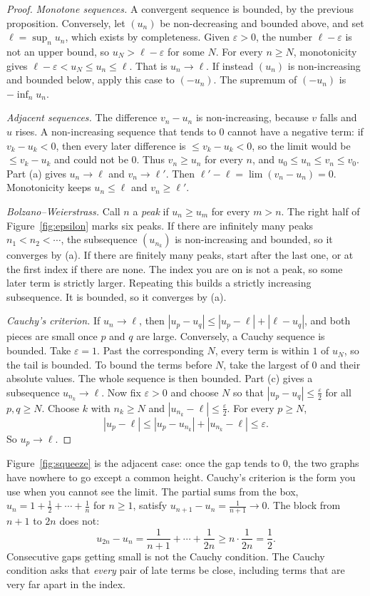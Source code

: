 \begin{proof}
\emph{Monotone sequences.} A convergent sequence is bounded, by the previous proposition. Conversely, let $(u_n)$ be non-decreasing and bounded above, and set $\ell=\sup_n u_n$, which exists by completeness. Given $\varepsilon>0$, the number $\ell-\varepsilon$ is not an upper bound, so $u_N>\ell-\varepsilon$ for some $N$. For every $n\ge N$, monotonicity gives $\ell-\varepsilon<u_N\le u_n\le\ell$. That is $u_n\to\ell$. If instead $(u_n)$ is non-increasing and bounded below, apply this case to $(-u_n)$. The supremum of $(-u_n)$ is $-\inf_n u_n$.

\emph{Adjacent sequences.} The difference $v_n-u_n$ is non-increasing, because $v$ falls and $u$ rises. A non-increasing sequence that tends to $0$ cannot have a negative term: if $v_k-u_k<0$, then every later difference is $\le v_k-u_k<0$, so the limit would be $\le v_k-u_k$ and could not be $0$. Thus $v_n\ge u_n$ for every $n$, and $u_0\le u_n\le v_n\le v_0$. Part (a) gives $u_n\to\ell$ and $v_n\to\ell'$. Then $\ell'-\ell=\lim(v_n-u_n)=0$. Monotonicity keeps $u_n\le\ell$ and $v_n\ge\ell'$.

\emph{Bolzano--Weierstrass.} Call $n$ a \emph{peak} if $u_n\ge u_m$ for every $m>n$. The right half of Figure~\ref{fig:epsilon} marks six peaks. If there are infinitely many peaks $n_1<n_2<\cdots$, the subsequence $(u_{n_k})$ is non-increasing and bounded, so it converges by (a). If there are finitely many peaks, start after the last one, or at the first index if there are none. The index you are on is not a peak, so some later term is strictly larger. Repeating this builds a strictly increasing subsequence. It is bounded, so it converges by (a).

\emph{Cauchy's criterion.} If $u_n\to\ell$, then $|u_p-u_q|\le|u_p-\ell|+|\ell-u_q|$, and both pieces are small once $p$ and $q$ are large. Conversely, a Cauchy sequence is bounded. Take $\varepsilon=1$. Past the corresponding $N$, every term is within $1$ of $u_N$, so the tail is bounded. To bound the terms before $N$, take the largest of $0$ and their absolute values. The whole sequence is then bounded. Part (c) gives a subsequence $u_{n_k}\to\ell$. Now fix $\varepsilon>0$ and choose $N$ so that $|u_p-u_q|\le\frac\varepsilon2$ for all $p,q\ge N$. Choose $k$ with $n_k\ge N$ and $|u_{n_k}-\ell|\le\frac\varepsilon2$. For every $p\ge N$,
\[
|u_p-\ell|\le|u_p-u_{n_k}|+|u_{n_k}-\ell|\le\varepsilon.
\]
So $u_p\to\ell$.
\end{proof}

Figure~\ref{fig:squeeze} is the adjacent case: once the gap tends to $0$, the two graphs have nowhere to go except a common height. Cauchy's criterion is the form you use when you cannot see the limit. The partial sums from the box, $u_n=1+\frac12+\cdots+\frac1n$ for $n\ge1$, satisfy $u_{n+1}-u_n=\frac1{n+1}\to0$. The block from $n+1$ to $2n$ does not:
\[
u_{2n}-u_n=\frac1{n+1}+\cdots+\frac1{2n}\ge n\cdot\frac1{2n}=\frac12.
\]
Consecutive gaps getting small is not the Cauchy condition. The Cauchy condition asks that \emph{every} pair of late terms be close, including terms that are very far apart in the index.


